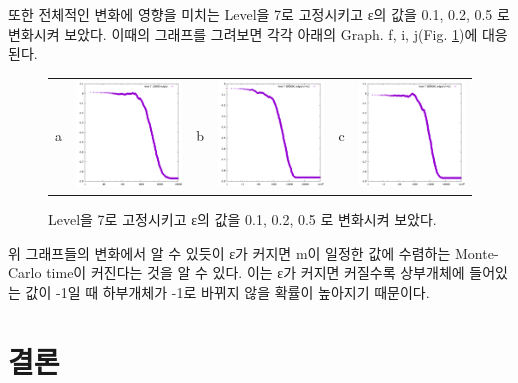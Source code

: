 \documentclass{gshs-report-v1.2}
\begin{document}
또한 전체적인 변화에 영향을 미치는 Level을 7로 고정시키고 ε의 값을 0.1, 0.2, 0.5 로 변화시켜 보았다. 이때의 그래프를 그려보면 각각 아래의 Graph. f, i, j(Fig. \ref{Fig06})에 대응된다.

\begin{figure}[h]
	\begin{center}
		\begin{tabular}[t]{llllll}
			a&\includegraphics[width=4cm]{(f).png}&  b&\includegraphics[width=4cm]{(i).png}&  c&\includegraphics[width=4cm]{(j).png} 
		\end{tabular}
		\caption{Level을 7로 고정시키고 ε의 값을 0.1, 0.2, 0.5 로 변화시켜 보았다.} 
		\label{Fig06}
	\end{center}
\end{figure}

위 그래프들의 변화에서 알 수 있듯이 ε가 커지면 m이 일정한 값에 수렴하는 Monte-Carlo time이 커진다는 것을 알 수 있다. 이는 ε가 커지면 커질수록 상부개체에 들어있는 값이 -1일 때 하부개체가 -1로 바뀌지 않을 확률이 높아지기 때문이다. 

\section{결론}
\end{document}
